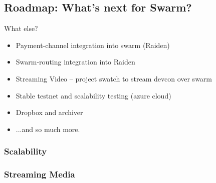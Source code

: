 \documentclass{beamer}
\begin{document}
\subsection[Roadmap]{Roadmap: What's next for Swarm?}
\begin{frame}
What else?
 \begin{itemize}
  \item<1-> Payment-channel integration into swarm (Raiden)
  \item<2-> Swarm-routing integration into Raiden
  \item<3-> Streaming Video -- project swatch to stream devcon over swarm
  \item<4-> Stable testnet and scalability testing (azure cloud)
  \item<5-> Dropbox and archiver
  \item<5-> ...and so much more.
  
 \end{itemize}

 
\end{frame}

\subsubsection{Scalability}
\wholeslide{ }
% 

\subsubsection{Streaming Media}
\wholeslide{ }
% 

 
\end{document}
